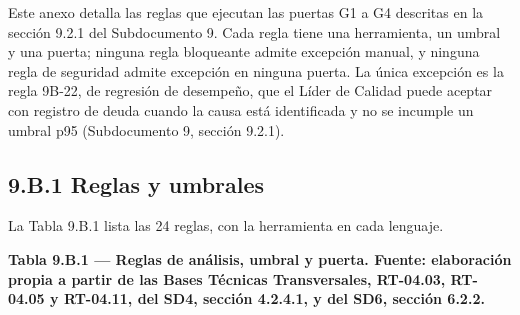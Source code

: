Este anexo detalla las reglas que ejecutan las puertas G1 a G4 descritas en la sección 9.2.1 del Subdocumento 9. Cada regla tiene una herramienta, un umbral y una puerta; ninguna regla bloqueante admite excepción manual, y ninguna regla de seguridad admite excepción en ninguna puerta. La única excepción es la regla 9B-22, de regresión de desempeño, que el Líder de Calidad puede aceptar con registro de deuda cuando la causa está identificada y no se incumple un umbral p95 (Subdocumento 9, sección 9.2.1).

\subsection*{9.B.1 Reglas y umbrales}

La Tabla 9.B.1 lista las 24 reglas, con la herramienta en cada lenguaje.

\textbf{Tabla 9.B.1 — Reglas de análisis, umbral y puerta. Fuente: elaboración propia a partir de las Bases Técnicas Transversales, RT-04.03, RT-04.05 y RT-04.11, del SD4, sección 4.2.4.1, y del SD6, sección 6.2.2.}

